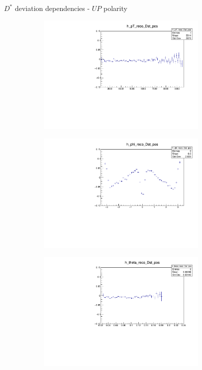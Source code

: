 \documentclass[11pt]{beamer}
\begin{document}
\begin{frame}{$D^*$ deviation dependencies - $UP$ polarity}
\begin{figure}
\begin{subfigure}{0.45\textwidth}
\includegraphics[width=0.9\textwidth]{up_pdf/deviation/h_pt_reco_Dst_pos.pdf}
\end{subfigure}
\begin{subfigure}{0.45\textwidth}
\includegraphics[width=0.9\textwidth]{up_pdf/deviation/h_phi_reco_Dst_pos.pdf}
\end{subfigure}
\begin{subfigure}{0.45\textwidth}
\includegraphics[width=0.9\textwidth]{up_pdf/deviation/h_theta_reco_Dst_pos.pdf}

\end{subfigure}
\end{figure}
\end{frame}
\end{document}
